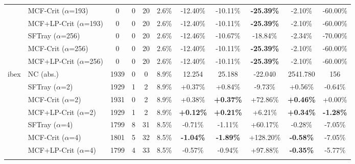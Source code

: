 \begin{table}[t]
{\begin{tabular}{ll|cccc|ccc|cc}
 & MCF-Crit ($\alpha$=193) & 0 & 0 & 20 & 2.6\% & -12.40\% & -10.11\% & \textbf{-25.39\%} & -2.10\% & -60.00\% \\

 & MCF+LP-Crit ($\alpha$=193) & 0 & 0 & 20 & 2.6\% & -12.40\% & -10.11\% & \textbf{-25.39\%} & -2.10\% & -60.00\% \\

\addlinespace[0.5em]

 & SFTray ($\alpha$=256) & 0 & 0 & 20 & 2.6\% & -12.46\% & -10.67\% & -18.84\% & -2.34\% & -70.00\% \\

 & MCF-Crit ($\alpha$=256) & 0 & 0 & 20 & 2.6\% & -12.40\% & -10.11\% & \textbf{-25.39\%} & -2.10\% & -60.00\% \\

 & MCF+LP-Crit ($\alpha$=256) & 0 & 0 & 20 & 2.6\% & -12.40\% & -10.11\% & \textbf{-25.39\%} & -2.10\% & -60.00\% \\

\midrule

\multirow{25}{*}{ibex} & NC (abs.) & 1939 & 0 & 0 & 8.9\% & 12.254 & 25.188 & -22.040 & 2541.780 & 156 \\

\addlinespace[0.4em]

 & SFTray ($\alpha$=2) & 1929 & 1 & 2 & 8.9\% & +0.37\% & +0.84\% & -9.73\% & +0.56\% & -0.64\% \\

 & MCF-Crit ($\alpha$=2) & 1931 & 0 & 2 & 8.9\% & +0.38\% & \textbf{+0.37\%} & +72.86\% & \textbf{+0.46\%} & +0.00\% \\

 & MCF+LP-Crit ($\alpha$=2) & 1929 & 1 & 2 & 8.9\% & \textbf{+0.12\%} & \textbf{+0.21\%} & +6.21\% & \textbf{+0.34\%} & \textbf{-1.28\%} \\

\addlinespace[0.5em]

 & SFTray ($\alpha$=4) & 1799 & 8 & 31 & 8.5\% & -0.71\% & -1.11\% & +60.17\% & -0.28\% & -7.05\% \\

 & MCF-Crit ($\alpha$=4) & 1801 & 5 & 32 & 8.5\% & \textbf{-1.04\%} & \textbf{-1.89\%} & +128.20\% & \textbf{-0.58\%} & -7.05\% \\

 & MCF+LP-Crit ($\alpha$=4) & 1799 & 4 & 33 & 8.5\% & -0.57\% & -0.94\% & +97.88\% & \textbf{-0.35\%} & -5.77\% \\

\addlinespace[0.5em]


\end{tabular}}
\end{table}
